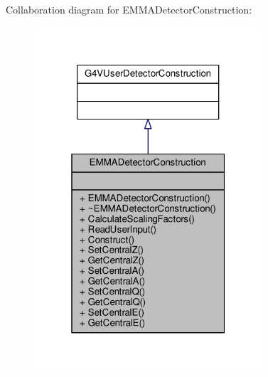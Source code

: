 Collaboration diagram for E\+M\+M\+A\+Detector\+Construction\+:
\nopagebreak
\begin{figure}[H]
\begin{center}
\leavevmode
\includegraphics[width=241pt]{classEMMADetectorConstruction__coll__graph}
\end{center}
\end{figure}
